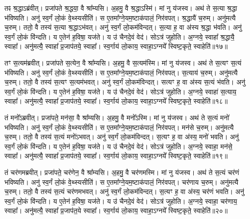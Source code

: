    तꣴ श्र॒द्धाऽब्र॑वीत्।
   प्रजा॑पते श्र॒द्धया॒ वै श्रा᳚म्यसि।
   अ॒हमु॒ वै श्र॒द्धाऽस्मि॑।
   मां नु य॑जस्व।
   अथ॑ ते स॒त्या श्र॒द्धा भ॑विष्यति।
   अनु॑ स्व॒र्गं लो॒कं वे॒थ्स्यसीति॑।
   स ए॒तमा᳚ग्ने॒यम॒ष्टाक॑पालं॒ निर॑वपत्।
   श्र॒द्धायै॑ च॒रुम्।
   अनु॑मत्यै च॒रुम्।
   ततो॒ वै तस्य॑ स॒त्या श्र॒द्धाऽभ॑वत्।
   अनु॑ स्व॒र्गं लो॒कम॑विन्दत्।
   स॒त्या ह॒ वा अ॑स्य श्र॒द्धा भ॑वति।
   अनु॑ स्व॒र्गं लो॒कं वि॑न्दति।
   य ए॒तेन॑ ह॒विषा॒ यज॑ते।
   य उ॑ चैनदे॒वं वेद॑।
   सोऽत्र॑ जुहोति।
   अ॒ग्नये॒ स्वाहा᳚ श्र॒द्धायै॒ स्वाहा᳚।
   अनु॑मत्यै॒ स्वाहा᳚ प्र॒जाप॑तये॒ स्वाहा᳚।
   स्व॒र्गाय॑ लो॒काय॒ स्वाहा॒ऽग्नये᳚ स्विष्ट॒कृते॒ स्वाहेति॑॥१७॥

   तꣳ स॒त्यम॑ब्रवीत्।
   प्रजा॑पते स॒त्येन॒ वै श्रा᳚म्यसि।
   अ॒हमु॒ वै स॒त्यम॑स्मि।
   मां नु य॑जस्व।
   अथ॑ ते स॒त्यꣳ स॒त्यं भ॑विष्यति।
   अनु॑ स्व॒र्गं लो॒कं वे॒थ्स्यसीति॑।
   स ए॒तमा᳚ग्ने॒यम॒ष्टाक॑पालं॒ निर॑वपत्।
   स॒त्याय॑ च॒रुम्।
   अनु॑मत्यै च॒रुम्।
   ततो॒ वै तस्य॑ स॒त्यꣳ स॒त्यम॑भवत्।
   अनु॑ स्व॒र्गं लो॒कम॑विन्दत्।
   सत्यꣳ ह॒ वा अ॑स्य स॒त्यं भ॑वति।
   अनु॑ स्व॒र्गं लो॒कं वि॑न्दति।
   य ए॒तेन॑ ह॒विषा॒ यज॑ते।
   य उ॑ चैनदे॒वं वेद॑।
   सोऽत्र॑ जुहोति।
   अ॒ग्नये॒ स्वाहा॑ स॒त्याय॒ स्वाहा᳚।
   अनु॑मत्यै॒ स्वाहा᳚ प्र॒जाप॑तये॒ स्वाहा᳚।
   स्व॒र्गाय॑ लो॒काय॒ स्वाहा॒ऽग्नये᳚ स्विष्ट॒कृते॒ स्वाहेति॑॥१८॥

   तं मनो᳚ऽब्रवीत्।
   प्रजा॑पते॒ मन॑सा॒ वै श्रा᳚म्यसि।
   अ॒हमु॒ वै मनो᳚ऽस्मि।
   मां नु य॑जस्व।
   अथ॑ ते स॒त्यं मनो॑ भविष्यति।
   अनु॑ स्व॒र्गं लो॒कं वे॒थ्स्यसीति॑।
   स ए॒तमा᳚ग्ने॒यम॒ष्टाक॑पालं॒ निर॑वपत्।
   मन॑से च॒रुम्।
   अनु॑मत्यै च॒रुम्।
   ततो॒ वै तस्य॑ स॒त्यं मनो॑ऽभवत्।
   अनु॑ स्व॒र्गं लो॒कम॑विन्दत्।
   स॒त्यꣳ ह॒ वा अ॑स्य॒ मनो॑ भवति।
   अनु॑ स्व॒र्गं लो॒कं वि॑न्दति।
   य ए॒तेन॑ ह॒विषा॒ यज॑ते।
   य उ॑ चैनदे॒वं वेद॑।
   सोऽत्र॑ जुहोति।
   अ॒ग्नये॒ स्वाहा॒ मन॑से॒ स्वाहा᳚।
   अनु॑मत्यै॒ स्वाहा᳚ प्र॒जाप॑तये॒ स्वाहा᳚।
   स्व॒र्गाय॑ लो॒काय॒ स्वाहा॒ऽग्नये᳚ स्विष्ट॒कृते॒ स्वाहेति॑॥१९॥

   तं चर॑णमब्रवीत्।
   प्रजा॑पते॒ चर॑णेन॒ वै श्रा᳚म्यसि।
   अ॒हमु॒ वै चर॑णमस्मि।
   मां नु य॑जस्व।
   अथ॑ ते स॒त्यं चर॑णं भविष्यति।
   अनु॑ स्व॒र्गं लो॒कं वे॒थ्स्यसीति॑।
   स ए॒तमा᳚ग्ने॒यम॒ष्टाक॑पालं॒ निर॑वपत्।
   चर॑णाय च॒रुम्।
   अनु॑मत्यै च॒रुम्।
   ततो॒ वै तस्य॑ स॒त्यं चर॑णमभवत्।
   अनु॑ स्व॒र्गं लो॒कम॑विन्दत्।
   स॒त्यꣳ ह॒ वा अ॑स्य॒ चर॑णं भवति।
   अनु॑ स्व॒र्गं लो॒कं वि॑न्दति।
   य ए॒तेन॑ ह॒विषा॒ यज॑ते।
   य उ॑ चैनदे॒वं वेद॑।
   सोऽत्र॑ जुहोति।
   अ॒ग्नये॒ स्वाहा॒ चर॑णाय॒ स्वाहा᳚।
   अनु॑मत्यै॒ स्वाहा᳚ प्र॒जाप॑त॒ये स्वाहा᳚।
   स्व॒र्गाय॑ लो॒काय॒ स्वाहा॒ऽग्नये᳚ स्विष्ट॒कृते॒ स्वाहेति॑॥२०॥

